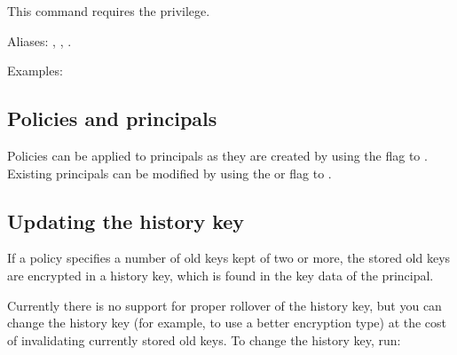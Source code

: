 \documentclass[letterpaper,10pt,english]{sphinxmanual}
\begin{document}
This command requires the  privilege.

Aliases: , , .

Examples:

%
\begin{sphinxVerbatim}[commandchars=\\\{\}]
  

   
\end{sphinxVerbatim}


\subsection{Policies and principals}
\label{\detokenize{admin/database:policies-and-principals}}
Policies can be applied to principals as they are created by using
the  flag to {\hyperref[\detokenize{admin/admin_commands/kadmin_local:add-principal}]{}}. Existing principals can
be modified by using the  or  flag to
{\hyperref[\detokenize{admin/admin_commands/kadmin_local:modify-principal}]{}}.


\subsection{Updating the history key}
\label{\detokenize{admin/database:updating-the-history-key}}
If a policy specifies a number of old keys kept of two or more, the
stored old keys are encrypted in a history key, which is found in the
key data of the  principal.

Currently there is no support for proper rollover of the history key,
but you can change the history key (for example, to use a better
encryption type) at the cost of invalidating currently stored old
keys.  To change the history key, run:
\end{document}
